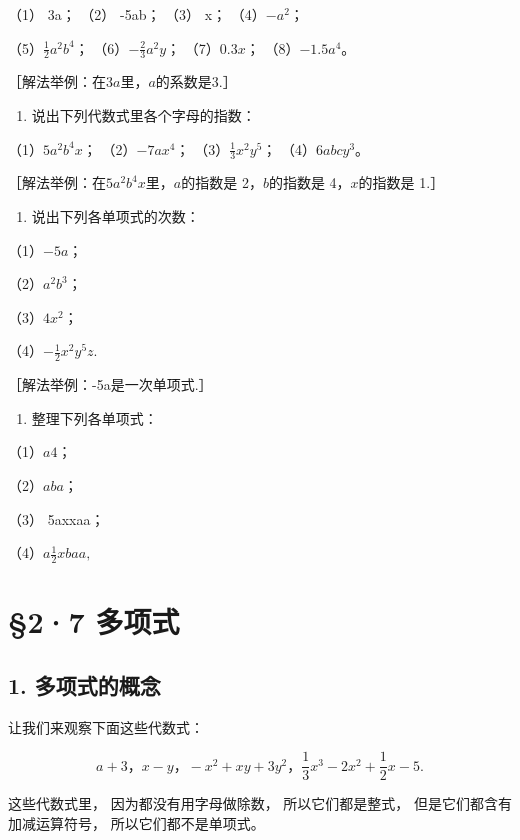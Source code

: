 （1） 3a； （2） -5ab； （3） x； （4）\(-a^{2}\)；

（5）\(\frac{1}{2} a^2 b^4\)； （6）\(-\frac{2}{3} a^2 y\)；
（7）\(0.3x\)； （8）\(-1.5a^4\)。

［解法举例：在\(3a\)里，\(a\)的系数是3.］

\begin{enumerate}[start=3]
\item
  说出下列代数式里各个字母的指数：
\end{enumerate}

（1）\(5a^{2}b^{4}x\)； （2）\(-7ax^{4}\)；
（3）\(\frac{1}{3} x^{2}y^{5}\)； （4）\(6abcy^{3}\)。

［解法举例：在\(5a^{2}b^{4}x\)里，\(a\)的指数是 2，\(b\)的指数是
4，\(x\)的指数是 1.］

\begin{enumerate}[start=4]
\item
  说出下列各单项式的次数：
\end{enumerate}

（1）\(-5a\)；

（2）\(a^2 b^3\)；

（3）\(4x^{2}\)；

（4）\(-\frac{1}{2} x^{2}y^{5}z.\)

［解法举例：-5a是一次单项式.］

\begin{enumerate}[start=5]
\item
  整理下列各单项式：
\end{enumerate}

（1）\(a4\)；

（2）\(aba\)；

（3） 5axxaa；

（4）\(a\frac{1}{2} xbaa,\)

\section{§2·7 多项式}

\subsection{1. 多项式的概念}

让我们来观察下面这些代数式：

\[
a + 3\text{，} x - y\text{，} - x ^{2} + x y + 3 y ^{2}\text{，} \frac{1}{3} x ^{3} - 2 x ^{2} + \frac{1}{2} x - 5.
\]

这些代数式里， 因为都没有用字母做除数， 所以它们都是整式，
但是它们都含有加减运算符号， 所以它们都不是单项式。

